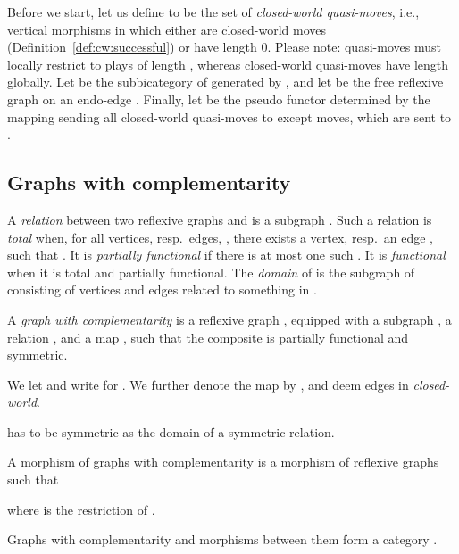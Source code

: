 \documentclass{LMCS}
\theoremstyle{plain}\newtheorem{satz}[thm]{Satz}
\begin{document}
Before we start, let us define  to be the set of
\emph{closed-world quasi-moves}, i.e., vertical morphisms in 
which either are closed-world moves
(Definition~\ref{def:cw:successful}) or have length 0.  
Please note: quasi-moves must locally restrict to plays of length , whereas
closed-world quasi-moves have length  globally.
Let  be
the subbicategory of  generated by , and let  be the
free reflexive graph on an endo-edge .  Finally, let
 be the pseudo functor
determined by the mapping  sending all closed-world
quasi-moves to  except  moves, which are sent to .

\subsection{Graphs with complementarity}
A \emph{relation}  between two reflexive graphs  and
 is a subgraph . Such a relation  is
\emph{total} when, for all vertices, resp.\ edges, , there
exists a vertex, resp.\ an edge , such that . It
is \emph{partially functional} if there is at most one such .  It is
\emph{functional} when it is total and partially functional.  The
\emph{domain} of  is the subgraph of  consisting of vertices and
edges related to something in .
\begin{defi}
  A \emph{graph with complementarity} is a reflexive graph ,
  equipped with a subgraph , a relation , and a map , such that
  the composite  is partially functional
  and symmetric.
\end{defi}
We let  and write  for . We further denote the map  by , and deem edges in 
\emph{closed-world}.

\begin{rem}
   has to be symmetric as the domain of a symmetric relation.
\end{rem}

\begin{defi}
  A morphism of graphs with complementarity is a morphism  of reflexive graphs such that
  where  is the restriction of .
\end{defi}

\begin{prop}
  Graphs with complementarity and morphisms between them form a category .
\end{prop}
\end{document}
